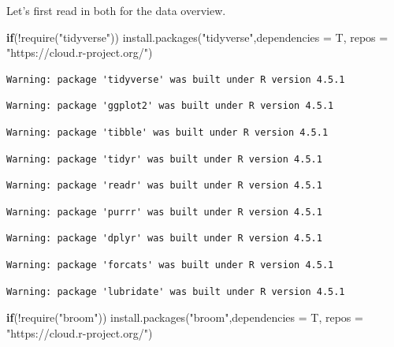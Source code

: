 \documentclass[
  letterpaper,
  DIV=11,
  numbers=noendperiod]{scrreprt}
\newenvironment{Shaded}{\begin{snugshade}}{\end{snugshade}}
\newcommand{\AttributeTok}[1]{\textcolor[rgb]{0.40,0.45,0.13}{#1}}
\newcommand{\ControlFlowTok}[1]{\textcolor[rgb]{0.00,0.23,0.31}{\textbf{#1}}}
\newcommand{\FunctionTok}[1]{\textcolor[rgb]{0.28,0.35,0.67}{#1}}
\newcommand{\NormalTok}[1]{\textcolor[rgb]{0.00,0.23,0.31}{#1}}
\newcommand{\SpecialCharTok}[1]{\textcolor[rgb]{0.37,0.37,0.37}{#1}}
\newcommand{\StringTok}[1]{\textcolor[rgb]{0.13,0.47,0.30}{#1}}
\begin{document}
Let's first read in both for the data overview.

\begin{Shaded}
\begin{Highlighting}[]
\ControlFlowTok{if}\NormalTok{(}\SpecialCharTok{!}\FunctionTok{require}\NormalTok{(}\StringTok{"tidyverse"}\NormalTok{))}
  \FunctionTok{install.packages}\NormalTok{(}\StringTok{"tidyverse"}\NormalTok{,}\AttributeTok{dependencies =}\NormalTok{ T, }\AttributeTok{repos =} \StringTok{"https://cloud.r{-}project.org/"}\NormalTok{)}
\end{Highlighting}
\end{Shaded}

\begin{verbatim}
Warning: package 'tidyverse' was built under R version 4.5.1
\end{verbatim}

\begin{verbatim}
Warning: package 'ggplot2' was built under R version 4.5.1
\end{verbatim}

\begin{verbatim}
Warning: package 'tibble' was built under R version 4.5.1
\end{verbatim}

\begin{verbatim}
Warning: package 'tidyr' was built under R version 4.5.1
\end{verbatim}

\begin{verbatim}
Warning: package 'readr' was built under R version 4.5.1
\end{verbatim}

\begin{verbatim}
Warning: package 'purrr' was built under R version 4.5.1
\end{verbatim}

\begin{verbatim}
Warning: package 'dplyr' was built under R version 4.5.1
\end{verbatim}

\begin{verbatim}
Warning: package 'forcats' was built under R version 4.5.1
\end{verbatim}

\begin{verbatim}
Warning: package 'lubridate' was built under R version 4.5.1
\end{verbatim}

\begin{Shaded}
\begin{Highlighting}[]
\ControlFlowTok{if}\NormalTok{(}\SpecialCharTok{!}\FunctionTok{require}\NormalTok{(}\StringTok{"broom"}\NormalTok{))}
  \FunctionTok{install.packages}\NormalTok{(}\StringTok{"broom"}\NormalTok{,}\AttributeTok{dependencies =}\NormalTok{ T, }\AttributeTok{repos =} \StringTok{"https://cloud.r{-}project.org/"}\NormalTok{)}
\end{Highlighting}
\end{Shaded}
\end{document}
